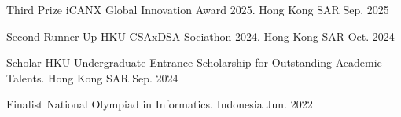 



\begin{cvhonors}

  \cvhonor
    {Third Prize} %
    {iCANX Global Innovation Award 2025.} %
    {Hong Kong SAR} %
    {Sep. 2025} %
    
  \cvhonor
    {Second Runner Up} %
    {HKU CSAxDSA Sociathon 2024.} %
    {Hong Kong SAR} %
    {Oct. 2024} %

  \cvhonor
    {Scholar} %
    {HKU Undergraduate Entrance Scholarship for Outstanding Academic Talents.} %
    {Hong Kong SAR} %
    {Sep. 2024} %
    
  \cvhonor
    {Finalist} %
    {National Olympiad in Informatics.} %
    {Indonesia} %
    {Jun. 2022} %

\end{cvhonors}
